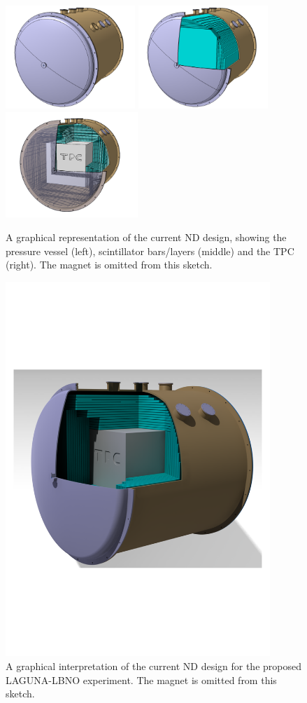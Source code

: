 \begin{figure}[hbtp]
	\begin{center}
		\includegraphics[width=49mm]{Chapter3/figures/8_LBNO2.png}
		\includegraphics[width=49mm]{Chapter3/figures/9_LBNO1.png}
		\includegraphics[width=50mm]{Chapter3/figures/5_LBNO5.png}
	\caption{A graphical representation of the current ND design, showing the pressure vessel (left), scintillator bars/layers (middle) and the TPC (right). The magnet is omitted from this sketch.}
	\label{fig:ndLayers}
	\end{center}
\end{figure}

\begin{figure}[htbp]
	\begin{center}
		\includegraphics[width=100mm]{Chapter3/figures/1_LBNO3.pdf}
		\caption{A graphical interpretation of the current ND design for the proposed LAGUNA-LBNO experiment. The magnet is omitted from this sketch.}
		\label{fig:ndDesign}
	\end{center}
\end{figure}

